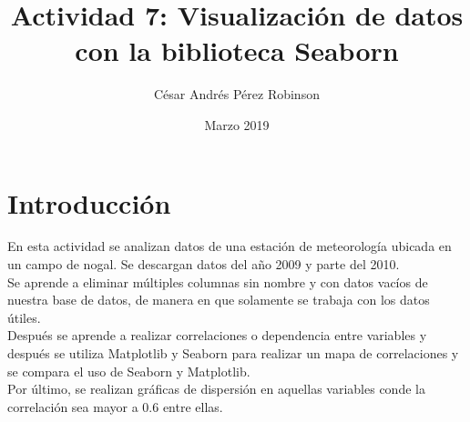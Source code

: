 \documentclass[11pt, spanish]{report}
\title{Actividad 7: Visualización de datos con la biblioteca Seaborn}
\author{César Andrés Pérez Robinson }
\date{Marzo 2019}
\begin{document}
\maketitle

\section{Introducción}
En esta actividad se analizan datos de una estación de meteorología ubicada en un campo de nogal. Se descargan datos del año 2009 y parte del 2010. \\
Se aprende a eliminar múltiples columnas sin nombre y con datos vacíos de nuestra base de datos, de manera en que solamente se trabaja con los datos útiles. \\
Después se aprende a realizar correlaciones o dependencia entre variables y después se utiliza Matplotlib y Seaborn para realizar un mapa de correlaciones y se compara el uso de Seaborn y Matplotlib. \\
Por último, se realizan gráficas de dispersión en aquellas variables conde la correlación sea mayor a 0.6 entre ellas.
\end{document}
